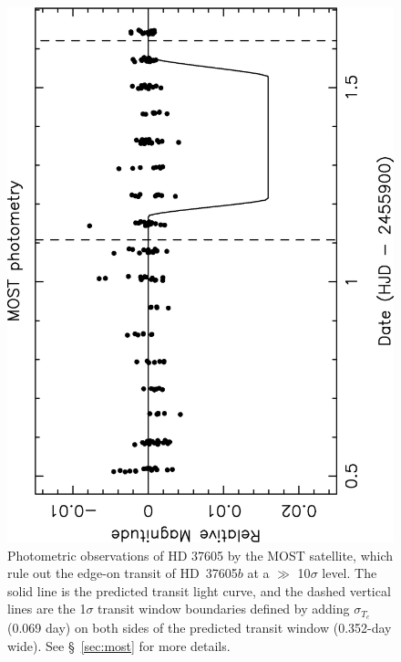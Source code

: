 \begin{figure}
\includegraphics[angle=270.,scale=0.5]{37605/f7.eps}
\caption{Photometric observations of HD 37605 by the MOST satellite,
  which rule out the edge-on transit of HD~37605$b$ at a
  $\gg$ 10$\sigma$ level. The solid line is the predicted transit
  light curve, and the dashed vertical lines are the 1$\sigma$
  transit window boundaries defined by adding $\sigma_{T_c}$ (0.069
  day) on both sides of the predicted transit window
  (0.352-day wide). See \S~\ref{sec:most} for more
  details. \label{most}}
\end{figure}







